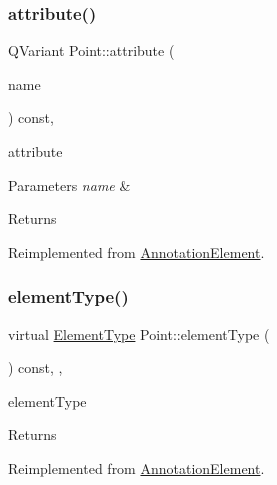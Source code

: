 \subsubsection{\texorpdfstring{attribute()}{attribute()}}
{\footnotesize\ttfamily Q\+Variant Point\+::attribute (\begin{DoxyParamCaption}\item[{const Q\+String \&}]{name }\end{DoxyParamCaption}) const\hspace{0.3cm}{\ttfamily [override]}, {\ttfamily [virtual]}}



attribute 


\begin{DoxyParams}{Parameters}
{\em name} & \\
\hline
\end{DoxyParams}
\begin{DoxyReturn}{Returns}

\end{DoxyReturn}


Reimplemented from \hyperlink{class_annotation_element_a55f85fb15ed52122653b0769c857899c}{Annotation\+Element}.

\mbox{\label{class_point_ac576e4660a79cf5bbffa4591a22d2a28}} 
\subsubsection{\texorpdfstring{element\+Type()}{elementType()}}
{\footnotesize\ttfamily virtual \hyperlink{class_annotation_element_af5282990ffbe25eeea8ab02037e344b0}{Element\+Type} Point\+::element\+Type (\begin{DoxyParamCaption}{ }\end{DoxyParamCaption}) const\hspace{0.3cm}{\ttfamily [inline]}, {\ttfamily [override]}, {\ttfamily [virtual]}}



element\+Type 

\begin{DoxyReturn}{Returns}

\end{DoxyReturn}


Reimplemented from \hyperlink{class_annotation_element_a9b2d5cf05a2f81d9b2103a5c736dfb2d}{Annotation\+Element}.

